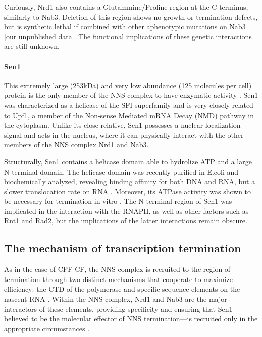 Curiously, Nrd1 also contains a Glutammine/Proline region at the C-terminus, similarly to Nab3. 
Deletion of this region shows no growth or termination defects, but is synthetic lethal if combined with other aphenotypic mutations on Nab3 [our unpublished data]. 
The functional implications of these genetic interactions are still unknown.
 

\paragraph{Sen1}

This extremely large (253kDa) and very low abundance (125 molecules per cell) protein is the only member of the NNS complex to have enzymatic activity \cite{steainmetz:1996:repression}. 
Sen1 was characterized as a helicase of the SFI superfamily and is very closely related to Upf1, a member of the Non-sense Mediated mRNA Decay (NMD) pathway in the cytoplasm. 
Unlike its close relative, Sen1 possesses a nuclear localization signal and acts in the nucleus, where it can physically interact with the other members of the NNS complex Nrd1 and Nab3. 

Structurally, Sen1 contains a helicase domain able to hydrolize ATP and a large N terminal domain. 
The helicase domain was recently purified in E.coli and biochemically analyzed, revealing binding affinity for both DNA and RNA, but a slower translocation rate on RNA \cite{martintumasz:2015:saccharomyces}. 
Moreover, its ATPase activity was shown to be necessary for termination in vitro \cite{porrua:2013:bacteriallike}. 
The N-terminal region of Sen1 was implicated in the interaction with the RNAPII, as well as other factors such as Rnt1 and Rad2, but the implications of the latter interactions remain obscure.

\subsection{The mechanism of transcription termination}

As in the case of CPF-CF, the NNS complex is recruited to the region of termination through two distinct mechanisms that cooperate to maximize efficiency: the CTD of the polymerase \cite{vasiljeva:2008:nrd1nab3sen1} and specific sequence elements on the nascent RNA \cite{conrad:2000:yeast}. 
Within the NNS complex, Nrd1 and Nab3 are the major interactors of these elements, providing specificity and ensuring that Sen1---believed to be the molecular effector of NNS termination---is recruited only in the appropriate circumstances \cite{porrua:2013:bacteriallike}.

